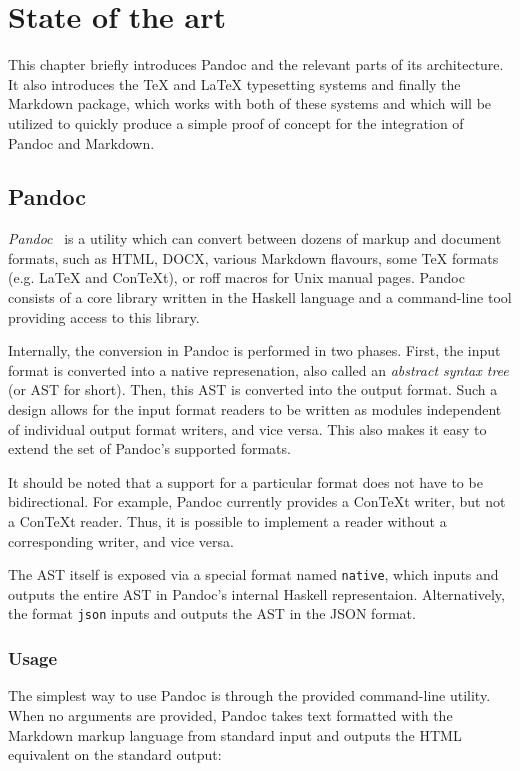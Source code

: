 \documentclass[
  digital,     %
  oneside,     %
  nosansbold,  %
  nocolorbold, %
  lof,         %
  nolot,       %
]{fithesis4}
\begin{document}
\chapter{State of the art}
This chapter briefly introduces Pandoc and the relevant parts of its architecture. It also introduces the \TeX{} and \LaTeX{} typesetting systems and finally the Markdown package, which works with both of these systems and which will be utilized to quickly produce a simple proof of concept for the integration of Pandoc and Markdown.

\section{Pandoc}
\emph{Pandoc}~\cite{pandoc} is a utility which can convert between dozens of markup and document formats, such as HTML, DOCX, various Markdown flavours, some \TeX{} formats (e.g. \LaTeX{} and Con\TeX{}t), or roff macros for Unix manual pages. Pandoc consists of a core library written in the Haskell language and a command-line tool providing access to this library.

Internally, the conversion in Pandoc is performed in two phases. First, the input format is converted into a native represenation, also called an \emph{abstract syntax tree} (or AST for short). Then, this AST is converted into the output format. Such a design allows for the input format readers to be written as modules independent of individual output format writers, and vice versa. This also makes it easy to extend the set of Pandoc's supported formats.

It should be noted that a support for a particular format does not have to be bidirectional. For example, Pandoc currently provides a Con\TeX{}t writer, but not a Con\TeX{}t reader. Thus, it is possible to implement a reader without a corresponding writer, and vice versa.

The AST itself is exposed via a special format named \texttt{native}, which inputs and outputs the entire AST in Pandoc's internal Haskell representaion. Alternatively, the format \texttt{json} inputs and outputs the AST in the JSON format.

\subsection{Usage}

The simplest way to use Pandoc is through the provided command-line utility. When no arguments are provided, Pandoc takes text formatted with the Markdown markup language from standard input and outputs the HTML equivalent on the standard output:
\end{document}
